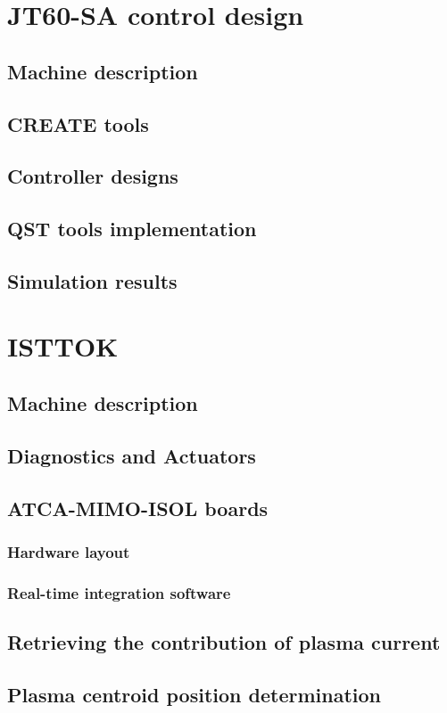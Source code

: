 \documentclass{article}
\begin{document}
\hfil
\section{JT60-SA control design}
\subsection{Machine description}
\subsection{CREATE tools}
\subsection{Controller designs}
\subsection{QST tools implementation}
\subsection{Simulation results}
\hfil
\section{ISTTOK }
\subsection{Machine description}
\subsection{Diagnostics and Actuators}
\subsection{ATCA-MIMO-ISOL boards}
\subsubsection{Hardware layout}
\subsubsection{Real-time  integration software}
\subsection{Retrieving the contribution of plasma current }
\subsection{Plasma centroid position determination}
\end{document}
